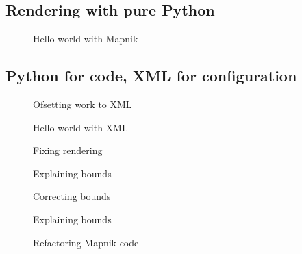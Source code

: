 \documentclass[letterpaper]{article}
\begin{document}
\subsection{Rendering with pure Python}
\label{sec:rendering-with-pure}

\begin{figure}[h]
  \centering
  
  \caption{Hello world with Mapnik}
  \label{fig:1}
\end{figure}

\subsection{Python for code, XML for configuration}
\label{sec:python-code-xml}

\begin{figure}[h]
  \centering
  
  \caption{Ofsetting work to XML}
  \label{fig:hw-py}
\end{figure}

\begin{figure}[h]
  \centering
  
  \caption{Hello world with XML}
  \label{fig:hw-xml}
\end{figure}

\begin{figure}[h]
  \centering
  
  \caption{Fixing rendering}
  \label{fig:hw-py-almost-fixed}
\end{figure}

\begin{figure}[h]
  \centering
  
  \caption{Explaining bounds}
  \label{fig:hw-py-corrected-and-explaining}
\end{figure}

\begin{figure}[h]
  \centering
  
  \caption{Correcting bounds}
  \label{fig:hw-py-corrected}
\end{figure}

\begin{figure}[h]
  \centering
  
  \caption{Explaining bounds}
  \label{fig:hw-py-projecting-coords}
\end{figure}

\begin{figure}[h]
  \centering
  
  \caption{Refactoring Mapnik code}
  \label{fig:hw-refactoring}
\end{figure}
\end{document}
